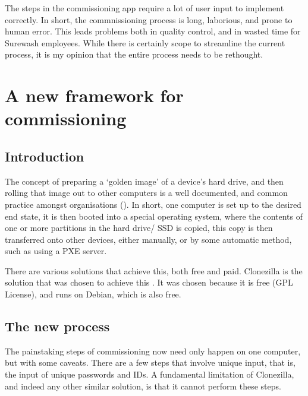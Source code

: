 The steps in the commissioning app require a lot of user input to implement correctly. In short, the commnissioning process is long, laborious, and prone to human error. This leads problems both in quality control, and in wasted time for Surewash employees. While there is certainly scope to streamline the current process, it is my opinion that the entire process needs to be rethought.

\section{A new framework for commissioning}
    \subsection{Introduction}
    The concept of preparing a `golden image' of a device's hard drive, and then rolling that image out to other computers is a well documented, and common practice amongst organisations (\cite{msftdeployment}). In short, one computer is set up to the desired end state, it is then booted into a special operating system, where the contents of one or more partitions in the hard drive/ SSD is copied, this copy is then transferred onto other devices, either manually, or by some automatic method, such as using a PXE server.

    There are various solutions that achieve this, both free and paid. Clonezilla is the solution that was chosen to achieve this \cite{clonezilla}. It was chosen because it is free (GPL License), and runs on Debian, which is also free.
    \subsection{The new process}
    The painstaking steps of commissioning now need only happen on one computer, but with some caveats. There are a few steps that involve unique input, that is, the input of unique passwords and IDs. A fundamental limitation of Clonezilla, and indeed any other similar solution, is that it cannot perform these steps.